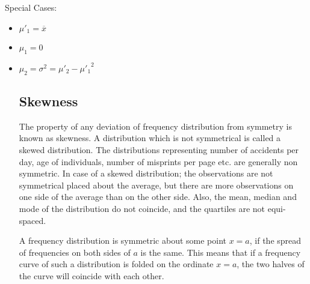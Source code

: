 \documentclass[
10pt, %
a4paper, %
]{report}
\begin{document}
Special Cases:
\begin{itemize}
\item \(\mu'_1 = \overline{x}\)
\item \(\mu_1 = 0\)
\item \(\mu_2 = \sigma^2 = \mu'_2 - {\mu'_1}^2\)

\subsection*{Skewness}

The property of any deviation of frequency distribution from symmetry is known as skewness. A distribution which is not symmetrical is called a skewed distribution. The distributions representing number of accidents per day, age of individuals, number of misprints per page etc. are generally non symmetric. In case of a skewed distribution; the observations are not symmetrical placed about the average, but there are more observations on one side of the average than on the other side. Also, the mean, median and mode of the distribution do not coincide, and the quartiles are not equi-spaced.

A frequency distribution is symmetric about some point \(x=a\), if the spread of frequencies on both sides of \(a\) is the same. This means that if a frequency curve of such a distribution is folded on the ordinate \(x = a\), the two halves of the curve will coincide with each other.


\end{itemize}
\end{document}
